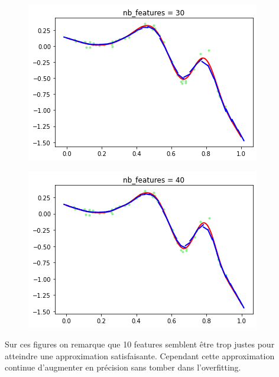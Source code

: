 \documentclass[french,12pt]{article}
\begin{document}
\begin{figure}[ht]
\begin{minipage}{.45\textwidth}
	\includegraphics[width=\textwidth]{lwr_nfeat_30.png}
	\label{fig:lwr_nfeat_30}
\end{minipage}
\hfill
\begin{minipage}{.45\textwidth}
	\centering
	\includegraphics[width=\textwidth]{lwr_nfeat_40.png}
	\label{fig:lwr_nfeat_40}
\end{minipage}
\end{figure}

Sur ces figures on remarque que 10 features semblent être trop justes pour atteindre une approximation satisfaisante. Cependant cette approximation continue d’augmenter en précision sans tomber dans l’overfitting.
\end{document}
